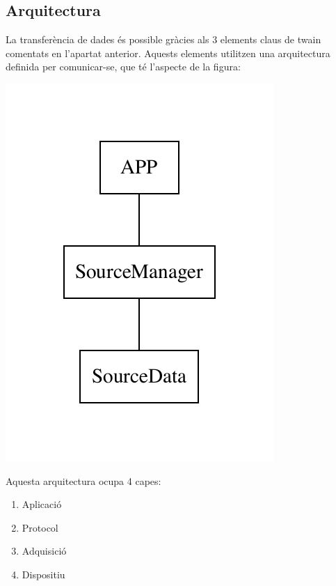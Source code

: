 \documentclass[letterpaper,11pt,catalan]{sphinxmanual}
\begin{document}


\subsection{Arquitectura}
\label{\detokenize{index:arquitectura}}
La transferència de dades és possible gràcies als 3 elements claus de twain comentats en l'apartat
anterior.
Aquests elements utilitzen una arquitectura definida per comunicar-se, que té l'aspecte
de la figura:

\includegraphics{graphviz-8ae89fd08ac2fd1f7bd8986e95108909e98b122b.pdf}

Aquesta arquitectura ocupa 4 capes:
\begin{enumerate}
\item {} 
Aplicació

\item {} 
Protocol

\item {} 
Adquisició

\item {} 
Dispositiu

\end{enumerate}
\end{document}
